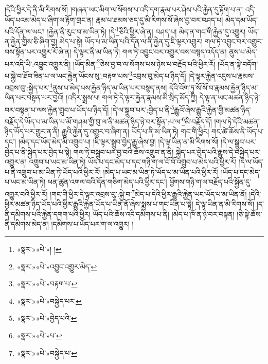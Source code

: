 །དེའི་ཕྱིར་དེ་ནི་མི་རིགས་སོ། །གཞན་ཡང་མིག་ལ་སོགས་པ་འདི་དག་རྣམ་པར་ཤེས་པའི་རྐྱེན་དུ་རྟོག་པ་ན། འདི་ཡོད་པའམ་མེད་པ་ཞིག་ལ་རྟོག་གྲང་ན། རྣམ་པ་ཐམས་ཅད་དུ་མི་རིགས་སོ་ཞེས་བྱ་བར་བཤད་པ། མེད་དམ་ཡོད་པའི་དོན་ལ་ཡང་། །རྐྱེན་ནི་རུང་བ་མ་ཡིན་ཏེ། །དེ་\footnote{«སྣར་»«པེ་»། །}ཅིའི་ཕྱིར་ཞེ་ན། བཤད་པ། མེད་ན་གང་གི་རྐྱེན་དུ་འགྱུར། ཡོད་ན་རྐྱེན་གྱིས་ཅི་ཞིག་བྱ། མེད་པ་སྟེ། ཡོད་པ་མ་ཡིན་པའི་དོན་ལ་ནི་རྐྱེན་དུ་ཇི་ལྟར་འགྱུར། གལ་ཏེ་འབྱུང་བར་འགྱུར་བས་སྟོན་པར་འགྱུར་རོ་ཞེ་ན། དེ་ལྟར་ནི་མ་ཡིན་ཏེ། གལ་ཏེ་འབྱུང་བར་འགྱུར་བས་བསྙད་འདོད་ན། ནུས་པ་མེད་པར་འདི་ཡི་:འབྱུང་འགྱུར་ནི། །ཡོད་མིན་\footnote{«སྣར་»«པེ་»འབྱུང་འགྱུར་མེད་}ཅེས་བྱ་བ་ལ་སོགས་པས་ཉེས་པ་བརྗོད་པའི་ཕྱིར་རོ། །ཡོད་ན་སྟེ་བདོག་པ་སྐྱེ་བ་ཐོབ་ཟིན་པ་ལ་ཡང་རྐྱེན་ཡོངས་སུ་:བརྟག་པས་\footnote{«སྣར་»«པེ་»བརྟག་པ་}འབྲས་བུ་མེད་པ་ཉིད་དོ། །དེ་ལྟར་རྐྱེན་འདུས་པ་རྣམས་འབྲས་བུ་:སྐྱེད་པར་\footnote{«སྣར་»«པེ་»བསྐྱེད་པར་}ནུས་པ་མེད་པས་རྐྱེན་ཉིད་མ་ཡིན་པར་བསྙད་ནས། དེའི་འོག་ཏུ་སོ་སོ་བ་རྣམས་རྐྱེན་ཉིད་མ་ཡིན་པར་བསྟན་པར་བྱའོ། །འདིར་སྨྲས་པ། གལ་ཏེ་དེ་ལྟར་རྐྱེན་རྣམས་མི་སྲིད་མོད་ཀྱི། དེ་ལྟ་ན་ཡང་མཚན་ཉིད་ཉེ་བར་བསྟན་པ་ལས་རྐྱེན་གྲུབ་པ་ཡོད་པ་ཉིད་དོ། །དེ་ལ་སྒྲུབ་པར་:བྱེད་པ་ནི་\footnote{«སྣར་»«པེ་»བྱེད་པའི་}རྒྱུའོ་ཞེས་རྒྱུའི་རྐྱེན་གྱི་མཚན་ཉིད་བརྗོད་དེ་ཡོད་པ་མ་ཡིན་པ་མོ་གཤམ་གྱི་བུ་ལ་ནི་མཚན་ཉིད་ཉེ་བར་སྟོན་:པ་ལ་\footnote{«སྣར་»«པེ་»པ་}མི་བརྗོད་དོ། །གལ་ཏེ་དེའི་མཚན་ཉིད་ཡོད་པར་གྱུར་ན་ནི། རྒྱུའི་རྐྱེན་དུ་འགྱུར་བ་ཞིག་ན། ཡོད་པ་ནི་མ་ཡིན་ཏེ། གང་གི་ཕྱིར། གང་ཚེ་ཆོས་ནི་ཡོད་པ་དང་། །མེད་དང་ཡོད་མེད་མི་འགྲུབ་པ། །ཇི་ལྟར་སྒྲུབ་བྱེད་རྒྱུ་ཞེས་བྱ། །དེ་ལྟ་ཡིན་ན་མི་རིགས་སོ། །དེ་ལ་སྒྲུབ་པར་བྱེད་པ་ནི་སྐྱེད་པར་བྱེད་པ་སྟེ། གལ་ཏེ་བསྒྲུབ་པར་བྱ་བའི་ཆོས་འགྲུབ་ན་ནི། སྐྱེད་པར་བྱེད་པའི་རྒྱུས་དེ་བསྐྱེད་པར་འགྱུར་ན། འགྲུབ་པ་ཡང་མ་ཡིན་ཏེ། ཡོད་པ་དང་མེད་པ་དང་གཉི་ག་ལ་ངོ་བོ་འགྲུབ་པ་མེད་པའི་ཕྱིར་རོ། །དེ་ལ་ཡོད་པ་ནི་འགྲུབ་པ་མ་ཡིན་ཏེ་ཡོད་པའི་ཕྱིར་རོ། །མེད་པ་ཡང་མ་ཡིན་ཏེ་ཡོད་པ་མ་ཡིན་པའི་ཕྱིར་རོ། །ཡོད་པ་དང་མེད་པ་ཡང་མ་ཡིན་ཏེ། ཕན་ཚུན་འགལ་བའི་དོན་གཅིག་མེད་པའི་ཕྱིར་དང་། ཕྱོགས་གཉི་ག་ལ་བརྗོད་པའི་སྐྱོན་དུ་འགྱུར་བའི་ཕྱིར་རོ། །གང་གི་ཕྱིར་དེ་ལྟར་འབྲས་བུ་:སྐྱེ་བ་\footnote{«སྣར་»«པེ་»བསྐྱེད་པ་}མེད་པ་དེའི་ཕྱིར་རྒྱུའི་རྐྱེན་ཡང་ཡོད་པ་མ་ཡིན་ནོ། །དེའི་ཕྱིར་མཚན་ཉིད་ཡོད་པའི་ཕྱིར་རྒྱུའི་རྐྱེན་ཡོད་པ་ཡིན་ནོ་ཞེས་སྨྲས་པ་གང་ཡིན་པ་སྟེ། དེ་ལྟ་ཡིན་ན་མི་རིགས་སོ། །ད་ནི་དམིགས་པའི་རྐྱེན་དགག་པའི་ཕྱིར། ཡོད་པའི་ཆོས་འདི་དམིགས་པ་ནི། །མེད་པ་ཁོ་ན་ཉེ་བར་བསྟན། །ཅི་སྟེ་ཆོས་ནི་དམིགས་མེད་ན། །དམིགས་པ་ཡོད་པར་ག་ལ་འགྱུར། །

